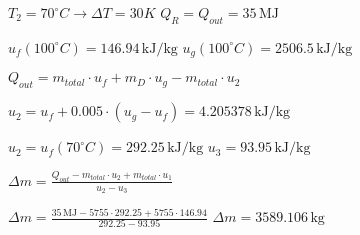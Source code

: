 \( T_2 = 70^\circ C \rightarrow \Delta T = 30 K \)  
\( Q_R = Q_{out} = 35 \, \text{MJ} \)  

\( u_f(100^\circ C) = 146.94 \, \text{kJ/kg} \)  
\( u_g(100^\circ C) = 2506.5 \, \text{kJ/kg} \)  

\( Q_{out} = m_{total} \cdot u_f + m_D \cdot u_g - m_{total} \cdot u_2 \)  

\( u_2 = u_f + 0.005 \cdot (u_g - u_f) = 4.205378 \, \text{kJ/kg} \)  

\( u_2 = u_f(70^\circ C) = 292.25 \, \text{kJ/kg} \)  
\( u_3 = 93.95 \, \text{kJ/kg} \)  

\( \Delta m = \frac{Q_{out} - m_{total} \cdot u_2 + m_{total} \cdot u_1}{u_2 - u_3} \)  

\( \Delta m = \frac{35 \, \text{MJ} - 5755 \cdot 292.25 + 5755 \cdot 146.94}{292.25 - 93.95} \)  
\( \Delta m = 3589.106 \, \text{kg} \)